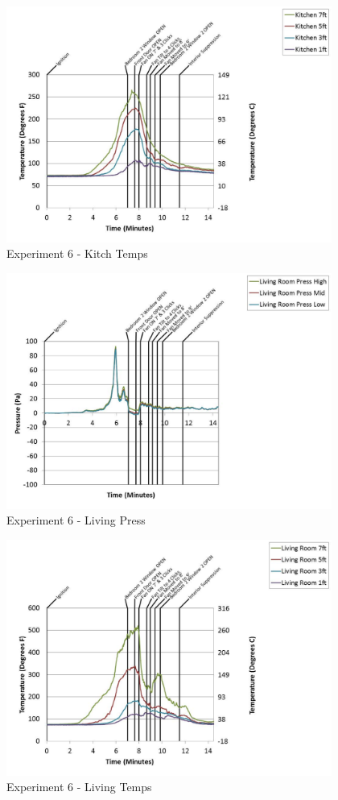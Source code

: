 \documentclass{article}
\begin{document}
\begin{appendices}
	\clearpage

	\begin{figure}[h!]
		\centering
		\includegraphics[height=3.05in]{0_Images/Results_Charts/Exp_6_Charts/KitchTemps.pdf}
		\caption{Experiment 6 - Kitch Temps}
	\end{figure}
 

	\begin{figure}[h!]
		\centering
		\includegraphics[height=3.05in]{0_Images/Results_Charts/Exp_6_Charts/LivingPress.pdf}
		\caption{Experiment 6 - Living Press}
	\end{figure}
 
	\clearpage

	\begin{figure}[h!]
		\centering
		\includegraphics[height=3.05in]{0_Images/Results_Charts/Exp_6_Charts/LivingTemps.pdf}
		\caption{Experiment 6 - Living Temps}
	\end{figure}
 


\end{appendices}
\end{document}
